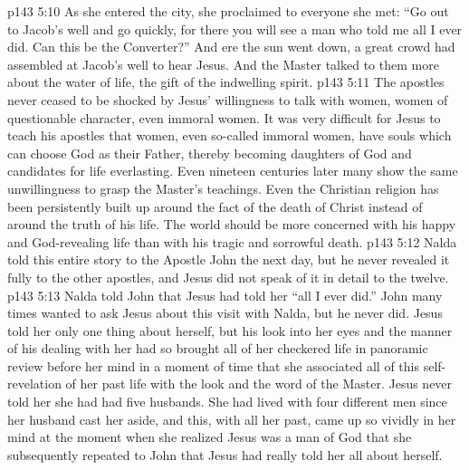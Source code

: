 \vs p143 5:10 As she entered the city, she proclaimed to everyone she met: “Go out to Jacob’s well and go quickly, for there you will see a man who told me all I ever did. Can this be the Converter?” And ere the sun went down, a great crowd had assembled at Jacob’s well to hear Jesus. And the Master talked to them more about the water of life, the gift of the indwelling spirit.
\vs p143 5:11 The apostles never ceased to be shocked by Jesus’ willingness to talk with women, women of questionable character, even immoral women. It was very difficult for Jesus to teach his apostles that women, even so\hyp{}called immoral women, have souls which can choose God as their Father, thereby becoming daughters of God and candidates for life everlasting. Even nineteen centuries later many show the same unwillingness to grasp the Master’s teachings. Even the Christian religion has been persistently built up around the fact of the death of Christ instead of around the truth of his life. The world should be more concerned with his happy and God\hyp{}revealing life than with his tragic and sorrowful death.
\vs p143 5:12 Nalda told this entire story to the Apostle John the next day, but he never revealed it fully to the other apostles, and Jesus did not speak of it in detail to the twelve.
\vs p143 5:13 Nalda told John that Jesus had told her “all I ever did.” John many times wanted to ask Jesus about this visit with Nalda, but he never did. Jesus told her only one thing about herself, but his look into her eyes and the manner of his dealing with her had so brought all of her checkered life in panoramic review before her mind in a moment of time that she associated all of this self\hyp{}revelation of her past life with the look and the word of the Master. Jesus never told her she had had five husbands. She had lived with four different men since her husband cast her aside, and this, with all her past, came up so vividly in her mind at the moment when she realized Jesus was a man of God that she subsequently repeated to John that Jesus had really told her all about herself.

